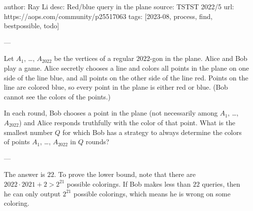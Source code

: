 author: Ray Li
desc: Red/blue query in the plane
source: TSTST 2022/5
url: https://aops.com/community/p25517063
tags: [2023-08, process, find, bestpossible, todo]

---

Let $A_1$, \dots, $A_{2022}$ be the vertices of a regular $2022$-gon in the plane.
Alice and Bob play a game.
Alice secretly chooses a line and colors all points in the plane
on one side of the line blue, and all points on the other side of the line red.
Points on the line are colored blue,
so every point in the plane is either red or blue.
(Bob cannot see the colors of the points.)

In each round, Bob chooses a point in the
plane (not necessarily among $A_1$, \dots, $A_{2022}$)
and Alice responds truthfully with the color of that point.
What is the smallest number $Q$ for which Bob has a strategy to
always determine the colors of points $A_1$, \dots, $A_{2022}$ in $Q$ rounds?

---

The answer is $22$.
To prove the lower bound, note that there are
$2022\cdot 2021 + 2 > 2^{21}$ possible colorings.
If Bob makes less than $22$ queries,
then he can only output $2^{21}$ possible colorings,
which means he is wrong on some coloring.

